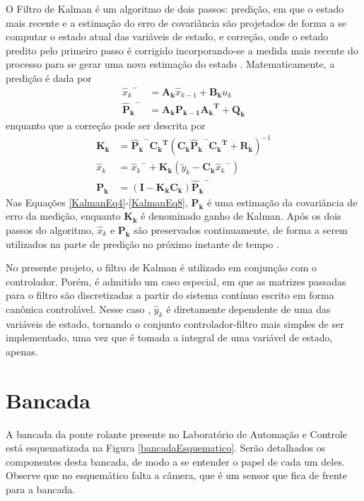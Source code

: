 O Filtro de Kalman é um algoritmo de dois passos: predição, em que o estado mais recente e a estimação do erro de covariância são projetados de forma a se computar o estado atual das variáveis de estado, e correção, onde o estado predito pelo primeiro passo é corrigido incorporando-se a medida mais recente do processo para se gerar uma nova estimação do estado \cite{GoddardKalman}. Matematicamente, a predição é dada por
\begin{align}
	\label{KalmanEq4} {\hat{x}_{k}}^{-} &= \mathbf{A_k} \hat{x}_{k-1} + \mathbf{B_k} u_k \\
	\label{KalmanEq5} \mathbf{{\hat{P}_{k}}^{-}} &= \mathbf{A_k}\mathbf{P_{k-1}}\mathbf{{A_k}^T} + \mathbf{Q_k}
\end{align}
 enquanto que a correção pode ser descrita por
\begin{align}
	\label{KalmanEq6} \mathbf{K_k} &= \mathbf{{\hat{P}_{k}}^{-}}\mathbf{{C_k}^T} {\left( \mathbf{C_k}\mathbf{{\hat{P}_{k}}^{-}}\mathbf{{C_k}^T} + \mathbf{R_k} \right)}^{-1} \\
	\label{KalmanEq7} \hat{x}_k &= {\hat{x}_{k}}^{-} + \mathbf{K_k} \left( \tilde{y}_k - \mathbf{C_k}{\hat{x}_{k}}^{-} \right) \\
	\label{KalmanEq8} \mathbf{P_k} &= \left( \mathbf{I} - \mathbf{K_k}\mathbf{C_k}\right)\mathbf{{\hat{P}_{k}}^{-}}
\end{align} 
Nas Equações \ref{KalmanEq4}-\ref{KalmanEq8}, $\mathbf{P_k}$ é uma estimação da covariância de erro da medição, enquanto $\mathbf{K_k}$ é denominado ganho de Kalman. Após os dois passos do algoritmo, $\hat{x}_k$ e $\mathbf{P_k}$ são preservados continuamente, de forma a serem utilizados na parte de predição no próximo instante de tempo \cite{GoddardKalman}.

No presente projeto, o filtro de Kalman é utilizado em conjunção com o controlador. Porém, é admitido um caso especial, em que as matrizes passadas para o filtro são discretizadas a partir do sistema contínuo escrito em forma canônica controlável. Nesse caso , $\hat{y}_k$ é diretamente dependente de uma das variáveis de estado, tornando o conjunto controlador-filtro mais simples de ser implementado, uma vez que é tomada a integral de uma variável de estado, apenas.

\section{Bancada\label{bancada}}
A bancada da ponte rolante presente no Laboratório de Automação e Controle está esquematizada na Figura \ref{bancadaEsquematico}. Serão detalhados os componentes desta bancada, de modo a se entender o papel de cada um deles. Observe que no esquemático falta a câmera, que é um sensor que fica de frente para a bancada. 

